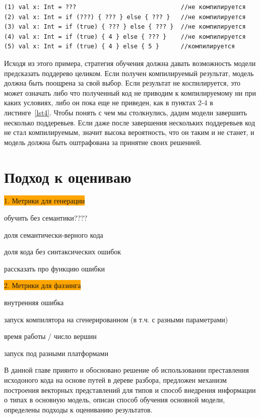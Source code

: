 \documentclass[times,specification,annotation]{itmo-student-thesis}
\begin{document}
\begin{lstlisting}[float=!h,caption={Возможная последовательная генерация},label={lst4}]
(1) val x: Int = ???                             //не компилируется
(2) val x: Int = if (???) { ??? } else { ??? }   //не компилируется
(3) val x: Int = if (true) { ??? } else { ??? }  //не компилируется
(4) val x: Int = if (true) { 4 } else { ??? }    //не компилируется
(5) val x: Int = if (true) { 4 } else { 5 }      //компилируется
\end{lstlisting}

Исходя из этого примера, стратегия обучения должна давать возможность модели предсказать поддерево целиком. Если получен компилируемый результат, модель должна быть поощрена за свой выбор. Если результат не коспилируется, это может означать либо что полученный код не приводим к компилируемому ни при каких условиях, либо он пока еще не приведен, как в пунктах 2-4 в листинге~\ref{lst4}. Чтобы понять с чем мы столкнулись, дадим модели завершить несколько поддеревьев. Если даже после завершения нескольких поддеревьев код не стал компилируемым, значит высока вероятность, что он таким и не станет, и модель должна быть оштрафована за принятие своих решенией.

\section{Подход к оцениваю}\label{rate}
\colorbox{orange}{1. Метрики для генерации}

обучить без семантики????

доля семантически-верного кода

доля кода без синтаксических ошибок

рассказать про функцию ошибки

\colorbox{orange}{2. Метрики для фаззинга}

внутренняя ошибка

запуск компилятора на сгенерированном (в т.ч. с разными параметрами)

время работы / число вершин

запуск под разными платформами

\chapterconclusion

В данной главе приянто и обосновано решение об использовании преставления исходоного кода на основе путей в дереве разбора, предложен механизм построения векторных представлений для типов и способ внедрения информации о типах в основную модель, описан способ обучения основной модели, определены подходы к оцениванию результатов.
\end{document}

